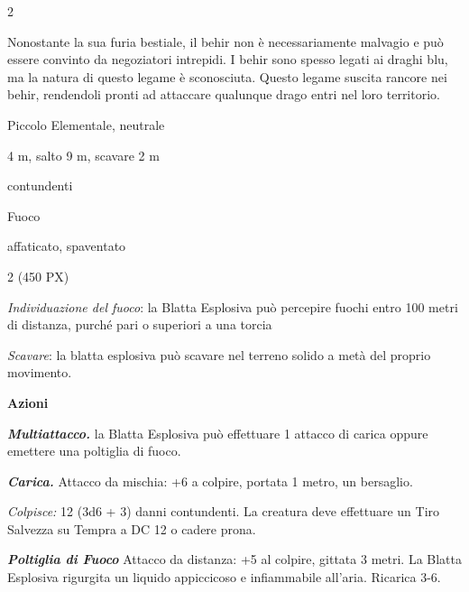 \begin{multicols}{2}
{Nonostante la sua furia bestiale, il behir non è necessariamente malvagio e può essere convinto da negoziatori intrepidi. I behir sono spesso legati ai draghi blu, ma la natura di questo legame è sconosciuta. Questo legame suscita rancore nei behir, rendendoli pronti ad attaccare qualunque drago entri nel loro territorio.

\begin{description}[noitemsep, topsep=0pt, parsep=0pt, partopsep=0pt, itemsep=1pt, leftmargin=2.35cm,  labelwidth=2.2cm, itemindent=0cm, listparindent=0pt] %
\setlength{\baselineskip}{10pt}
\item[\textbf{Taglia/Tipo}] Piccolo Elementale, neutrale
\item[\textbf{Caratt.}] 
\item[\textbf{Punti Ferita}] 
\item[\textbf{Movimento}] 4 m, salto 9 m, scavare 2 m
\item[\textbf{Tiri Salvez.}] 
\item[\textbf{Res. Danni}] contundenti
\item[\textbf{Imm. Danni}] Fuoco
\item[\textbf{Immunità}] affaticato, spaventato
\item[\textbf{Sensi}] 
\item[\textbf{Sfida}] 2 (450 PX)
\end{description}
\smallskip

\emph{Individuazione del fuoco}: la Blatta Esplosiva può percepire fuochi entro 100 metri di distanza, purché pari o superiori a una torcia

\emph{Scavare}: la blatta esplosiva può scavare nel terreno solido a metà del proprio movimento.

\textbf{Azioni}

\emph{\textbf{Multiattacco.}} la Blatta Esplosiva può effettuare 1 attacco di carica oppure emettere una poltiglia di fuoco.

\emph{\textbf{Carica.}} Attacco da mischia: +6 a colpire, portata 1 metro, un bersaglio.

\emph{Colpisce:} 12 (3d6 + 3) danni contundenti. La creatura deve effettuare un Tiro Salvezza su Tempra a DC 12 o cadere prona.

\emph{\textbf{Poltiglia di Fuoco}} Attacco da distanza: +5 al colpire, gittata 3 metri. La Blatta Esplosiva rigurgita un liquido appiccicoso e infiammabile all'aria. Ricarica 3-6.

}
\end{multicols}
